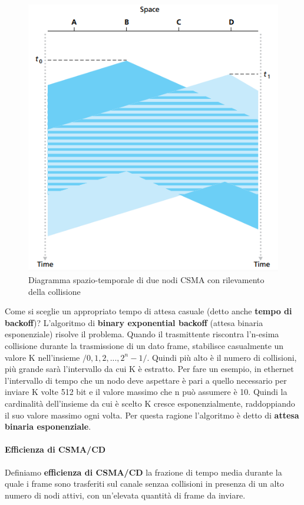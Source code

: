 \documentclass[11pt,a4paper]{book}
\begin{document}
\begin{figure}
	\begin{center}
		\includegraphics[scale=0.6]{img/080.png}
		\caption{Diagramma spazio-temporale di due nodi CSMA con rilevamento della collisione}
		\label{fig: 081}
	\end{center}
\end{figure}
Come si sceglie un appropriato tempo di attesa casuale (detto anche \textbf{tempo di backoff})? L'algoritmo di \textbf{binary exponential backoff} (attesa binaria esponenziale) risolve il problema. Quando il trasmittente riscontra l'n-esima collisione durante la trasmissione di un dato frame, stabilisce casualmente un valore K nell'insieme $/{0, 1, 2, ..., 2^{n} - 1/}$. Quindi più alto è il numero di collisioni, più grande sarà l'intervallo da cui K è estratto. Per fare un esempio, in ethernet l'intervallo di tempo che un nodo deve aspettare è pari a quello necessario per inviare K volte 512 bit e il valore massimo che n può assumere è 10. Quindi la cardinalità dell'insieme da cui è scelto K cresce esponenzialmente, raddoppiando il suo valore massimo ogni volta. Per questa ragione l'algoritmo è detto di \textbf{attesa binaria esponenziale}.

\paragraph{Efficienza di CSMA/CD}
Definiamo \textbf{efficienza di CSMA/CD} la frazione di tempo media durante la quale i frame sono trasferiti sul canale senzaa collisioni in presenza di un alto numero di nodi attivi, con un'elevata quantità di frame da inviare.
\end{document}
